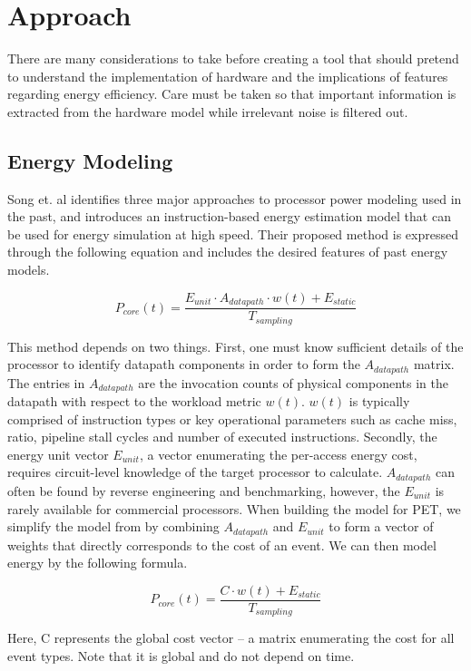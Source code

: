 \section{Approach}

There are many considerations to take before creating a tool that should pretend
to understand the implementation of hardware and the implications of features
regarding energy efficiency. Care must be taken so that important information is
extracted from the hardware model while irrelevant noise is filtered out.


\subsection{Energy Modeling}

Song et. al \cite{song2012instruction} identifies three major approaches to
processor power modeling used in the past, and introduces an instruction-based
energy estimation model that can be used for energy simulation at high speed.
Their proposed method is expressed through the following equation and includes
the desired features of past energy models.

\[
    P_{core}(t) = \frac{E_{unit} \cdot A_{datapath} \cdot w(t) +
    E_{static}}{T_{sampling}}
\]

This method depends on two things. First, one must know sufficient details of
the processor to identify datapath components in order to form the
$A_{datapath}$ matrix. The entries in $A_{datapath}$ are the invocation counts
of physical components in the datapath with respect to the workload metric
$w(t)$. $w(t)$ is typically comprised of instruction types or key operational
parameters such as cache miss, ratio, pipeline stall cycles and number of
executed instructions. Secondly, the energy unit vector $E_{unit}$, a vector
enumerating the per-access energy cost, requires circuit-level knowledge of the
target processor to calculate. $A_{datapath}$ can often be found by reverse
engineering and benchmarking, however, the $E_{unit}$ is rarely available for
commercial processors. When building the model for PET, we simplify the model
from \cite{song2012instruction} by combining $A_{datapath}$ and $E_{unit}$ to
form a vector of weights that directly corresponds to the cost of an event. We
can then model energy by the following formula.

\[
    P_{core}(t) = \frac{C \cdot w(t) + E_{static}}{T_{sampling}}
\]

Here, C represents the global cost vector -- a matrix enumerating the cost
for all event types. Note that it is global and do not depend on time.


